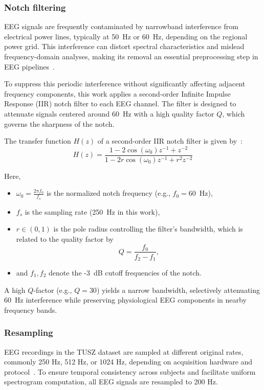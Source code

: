 \subsubsection{Notch filtering}
EEG signals are frequently contaminated by narrowband interference from electrical power lines, typically at 50~Hz or 60~Hz, depending on the regional power grid. This interference can distort spectral characteristics and mislead frequency-domain analyses, making its removal an essential preprocessing step in EEG pipelines~\cite{notch}.

To suppress this periodic interference without significantly affecting adjacent frequency components, this work applies a second-order Infinite Impulse Response (IIR) notch filter to each EEG channel. The filter is designed to attenuate signals centered around 60~Hz with a high quality factor $Q$, which governs the sharpness of the notch.

The transfer function $H(z)$ of a second-order IIR notch filter is given by~\cite{notch}:
\begin{equation}
H(z) = \frac{1 - 2\cos(\omega_0)z^{-1} + z^{-2}}{1 - 2r\cos(\omega_0)z^{-1} + r^2 z^{-2}}
\end{equation}

Here,
\begin{itemize}
  \item $\omega_0 = \frac{2\pi f_0}{f_s}$ is the normalized notch frequency (e.g., $f_0 = 60$~Hz),
  \item $f_s$ is the sampling rate (250~Hz in this work),
  \item $r \in (0,1)$ is the pole radius controlling the filter’s bandwidth, which is related to the quality factor by 
  \[
  Q = \frac{f_0}{f_2 - f_1},
  \]
  \item and $f_1, f_2$ denote the -3~dB cutoff frequencies of the notch.
\end{itemize}

A high $Q$-factor (e.g., $Q = 30$) yields a narrow bandwidth, selectively attenuating 60~Hz interference while preserving physiological EEG components in nearby frequency bands.

\subsubsection{Resampling}
EEG recordings in the TUSZ dataset are sampled at different original rates, commonly 250 Hz, 512 Hz, or 1024 Hz, depending on acquisition hardware and protocol~\cite{zscore}. To ensure temporal consistency across subjects and facilitate uniform spectrogram computation, all EEG signals are resampled to 200 Hz.


